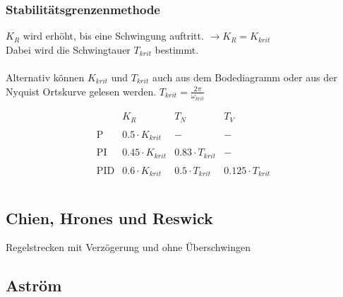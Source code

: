 \subsubsection{Stabilitätsgrenzenmethode}
$K_R$ wird erhöht, bis eine Schwingung auftritt. $\to K_R = K_{krit}$\\
Dabei wird die Schwingtauer $T_{krit}$ bestimmt. \\\\
Alternativ können $K_{krit}$ und $T_{krit}$ auch aus dem Bodediagramm oder 
aus der Nyquist Ortskurve gelesen werden. $T_{krit} = \frac{2 \pi}{\omega_{krit}}$
\begin{table}[h!]
    \[
        \begin{array}{lccc}
            &
                K_R &
                T_N &
                T_V \\\\
            \text{P} &
                0.5 \cdot K_{krit} &
                - &
                - \\\\
            \text{PI} &
                0.45 \cdot K_{krit} &
                0.83 \cdot T_{krit} &
                - \\\\
            \text{PID} &
                0.6 \cdot K_{krit} &
                0.5 \cdot T_{krit} &
                0.125 \cdot T_{krit} \\\\
        \end{array}
    \]
\end{table}


\subsection{Chien, Hrones und Reswick}
Regelstrecken mit Verzögerung und ohne Überschwingen
\begin{figure}[h!]
    \centering
\end{figure}

\subsection{Aström}


